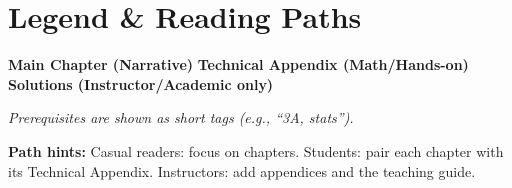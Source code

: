 
\chapter*{Legend \& Reading Paths}

\noindent \textbf{Main Chapter (Narrative)} \quad
 \textbf{Technical Appendix (Math/Hands-on)} \quad
 \textbf{Solutions (Instructor/Academic only)}

\vspace{1em}
\noindent\textit{Prerequisites are shown as short tags (e.g., ``3A, stats'').}

\vspace{1.1em}
\begin{QuickRecallBox}
\textbf{Path hints:} Casual readers: focus on chapters.
Students: pair each chapter with its Technical Appendix.
Instructors: add appendices and the teaching guide.
\end{QuickRecallBox}

